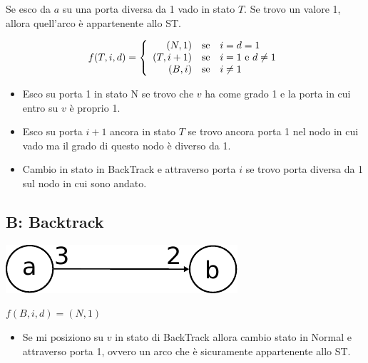 Se esco da $a$ su una porta diversa da 1 vado in stato $T$. Se trovo un valore
1, allora quell'arco è appartenente allo ST.

\begin{equation}
    f(T,i,d) =
    \left\{
    \begin{array}{r
            @{\quad{\mbox{se}}\quad}
            l}
        (N,1)   & i = d = 1                   \\
        (T,i+1) & i = 1 ~\textrm{e}~ d \neq 1 \\
        (B,i)   & i \neq 1                    \\
    \end{array}
    \right.
\end{equation}
\begin{itemize}
    \item Esco su porta 1 in stato N se trovo che $v$ ha come grado 1 e la porta
          in cui entro su $v$ è proprio 1.
    \item Esco su porta $i+1$ ancora in stato $T$ se trovo ancora porta 1 nel nodo
          in cui vado ma il grado di questo nodo è diverso da 1.
    \item Cambio in stato in BackTrack e attraverso porta $i$ se trovo porta
          diversa da 1 sul nodo in cui sono andato.
\end{itemize}


\subsection{B: Backtrack}
\begin{center}
    \includegraphics[scale=0.7]{capitoli/esplorazione-grafo-anonimo/imgs/n_28-2}
\end{center}

\begin{center}
    $f(B,i,d) = (N,1)$
\end{center}

\begin{itemize}
    \item Se mi posiziono su $v$ in stato di BackTrack allora cambio stato in
          Normal e attraverso porta 1, ovvero un arco che è sicuramente appartenente
          allo ST.
\end{itemize}

